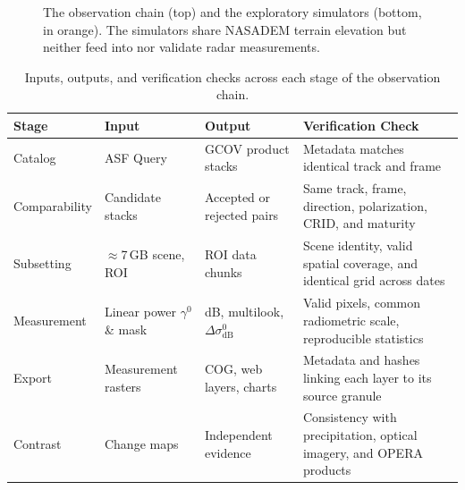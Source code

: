 \documentclass[11pt,a4paper]{article}
\newcommand{\gz}{\ensuremath{\gamma^{0}}}
\begin{document}
\begin{figure}[htbp]
\centering
{}
\caption{The observation chain (top) and the exploratory simulators (bottom, in orange). The simulators share NASADEM terrain elevation but neither feed into nor validate radar measurements.}
\label{fig:cadena-datos}
\end{figure}

\begin{table}[htbp]
\centering\small
\begin{tabularx}{\linewidth}{p{.19\linewidth}p{.24\linewidth}p{.22\linewidth}X}
\toprule
\textbf{Stage} & \textbf{Input} & \textbf{Output} & \textbf{Verification Check}\\\midrule
Catalog & ASF Query & GCOV product stacks & Metadata matches identical track and frame\\
Comparability & Candidate stacks & Accepted or rejected pairs & Same track, frame, direction, polarization, CRID, and maturity\\
Subsetting & $\approx$7\,GB scene, ROI & ROI data chunks & Scene identity, valid spatial coverage, and identical grid across dates\\
Measurement & Linear power \gz{} \& mask & dB, multilook, $\Delta\sigma^0_{\mathrm{dB}}$ & Valid pixels, common radiometric scale, reproducible statistics\\
Export & Measurement rasters & COG, web layers, charts & Metadata and hashes linking each layer to its source granule\\
Contrast & Change maps & Independent evidence & Consistency with precipitation, optical imagery, and OPERA products\\\bottomrule
\end{tabularx}
\caption{Inputs, outputs, and verification checks across each stage of the observation chain.}
\label{tab:eslabones}
\end{table}
\end{document}
